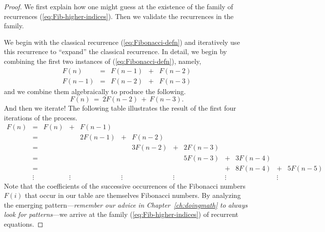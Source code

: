 \begin{proof}
We first explain how one might guess at the existence of the family of recurrences (\ref{eq:Fib-higher-indices}).  Then we validate the recurrences in the family.

\smallskip

We begin with the classical recurrence (\ref{eq:Fibonacci-defn}) and iteratively use this recurrence to ``expand'' the classical recurrence.  In detail, we begin by combining the first two instances of (\ref{eq:Fibonacci-defn}), namely,
\[
\begin{array}{lcrrr}
F(n)   & = & F(n-1) & + & F(n-2) \\
F(n-1) & = & F(n-2) & + & F(n-3)
\end{array}
\]
and we combine them algebraically to produce the following.
\[ F(n) \ = \ 2 F(n-2) \ + \ F(n-3). \]
And then we iterate!  The following table illustrates the result of the first four iterations of the process.
\[
\begin{array}{ccrcrcrcrcrcr}
F(n) & = & F(n) & + & F(n-1) \\
     & = &      &   & 2 F(n-1) & + & F(n-2) \\
     & = &      &   &          &   & 3 F(n-2) & + & 2 F(n-3) \\
     & = &      &   &          &   &          &   & 5 F(n-3) & + & 3 F(n-4)  \\
     & = &      &   &          &   &          &   &          & + & 8
F(n-4) & + & 5 F(n-5)  \\
 & \vdots  &  & \vdots  &  &  \vdots &  & \vdots
 &  & \vdots  &   & \vdots  & 
\end{array}
\]
Note that the coefficients of the successive occurrences of the Fibonacci numbers $F(i)$ that occur in our table are themselves Fibonacci numbers.  By analyzing the emerging pattern---{\em remember our advice in Chapter~\ref{ch:doingmath} to always look for patterns}---we arrive at the family (\ref{eq:Fib-higher-indices}) of recurrent equations.

\bigskip

\noindent {}
\bigskip


\end{proof}
